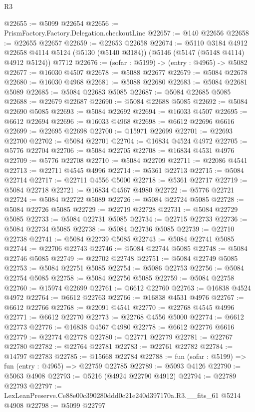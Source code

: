 \begin{lexlean}{R3}
\begin{coremodule}
@22655 := @5099 @22654
@22656 := PrismFactory.Factory.Delegation.checkoutLine
@22657 := @140 @22656
@22658 := @22655 @22657
@22659 := @22653 @22658
@22674 := @5110
    @3184
    @4912
    @22658
    @4114
    @5124
    (@5130 (@5140 @3184))
    (@5146 (@5147 (@5148 @4114) @4912 @5124))
    @7712
@22676 := (sofar : @5199) -> (entry : @4965) -> @5082
@22677 := @16030 @4507
@22678 := @5088 @22677
@22679 := @5084 @22678
@22680 := @16030 @4968
@22681 := @5088 @22680
@22683 := @5084 @22681 @5089
@22685 := @5084 @22683 @5085
@22687 := @5084 @22685 @5085
@22688 := @22679 @22687
@22690 := @5084 @22688 @5085
@22692 := @5084 @22690 @5085
@22693 := @5084 @22692
@22694 := @16033 @4507
@22695 := @6612 @22694
@22696 := @16033 @4968
@22698 := @6612 @22696 @6616
@22699 := @22695 @22698
@22700 := @15971 @22699
@22701 := @22693 @22700
@22702 := @5084 @22701
@22704 := @16834 @4524 @4972
@22705 := @5776 @22704
@22706 := @5084 @22705
@22708 := @16834 @4531 @4976
@22709 := @5776 @22708
@22710 := @5084 @22709
@22711 := @22086 @4541
@22713 := @22711 @4545 @4996
@22714 := @5361 @22713
@22715 := @5084 @22714
@22717 := @22711 @4556 @5000
@22718 := @5361 @22717
@22719 := @5084 @22718
@22721 := @16834 @4567 @4980
@22722 := @5776 @22721
@22724 := @5084 @22722 @5089
@22726 := @5084 @22724 @5085
@22728 := @5084 @22726 @5085
@22729 := @22719 @22728
@22731 := @5084 @22729 @5085
@22733 := @5084 @22731 @5085
@22734 := @22715 @22733
@22736 := @5084 @22734 @5085
@22738 := @5084 @22736 @5085
@22739 := @22710 @22738
@22741 := @5084 @22739 @5085
@22743 := @5084 @22741 @5085
@22744 := @22706 @22743
@22746 := @5084 @22744 @5085
@22748 := @5084 @22746 @5085
@22749 := @22702 @22748
@22751 := @5084 @22749 @5085
@22753 := @5084 @22751 @5085
@22754 := @5086 @22753
@22756 := @5084 @22754 @5085
@22758 := @5084 @22756 @5085
@22759 := @5084 @22758
@22760 := @15974 @22699
@22761 := @6612 @22760
@22763 := @16838 @4524 @4972
@22764 := @6612 @22763
@22766 := @16838 @4531 @4976
@22767 := @6612 @22766
@22768 := @22091 @4541
@22770 := @22768 @4545 @4996
@22771 := @6612 @22770
@22773 := @22768 @4556 @5000
@22774 := @6612 @22773
@22776 := @16838 @4567 @4980
@22778 := @6612 @22776 @6616
@22779 := @22774 @22778
@22780 := @22771 @22779
@22781 := @22767 @22780
@22782 := @22764 @22781
@22783 := @22761 @22782
@22784 := @14797 @22783
@22785 := @15668 @22784
@22788 := fun (sofar : @5199) => fun (entry : @4965) => @22759 @22785
@22789 := @5093 @4126
@22790 := @5063 @4908
@22793 := @5216 (@4924 @22790 @4912)
@22794 := @22789 @22793
@22797 := LexLeanPreserve.Ce88e00c390280ddd0c21e240d397170a.R3.__fits_61 @5214 @4908
@22798 := @5099 @22797

\end{coremodule}
\end{lexlean}

